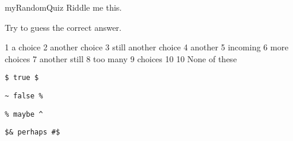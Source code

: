 \documentclass{article}
\begin{document}
\begin{quiz*}{myRandomQuiz}
    Riddle me this.
\begin{questions}
    \item Try to guess the correct answer.
    \begin{answers}{2}
    \bChoices[random]
         1 a choice\eAns
        \label{eq} 2 another choice\eAns
         3 still another choice\eAns
         4 another\eAns
         5 incoming\eAns
         6 more choices\eAns
         7 another still\eAns
         8 too many\eAns
         9 choices\eAns
         10 \eAns
    \eFreeze
         10 None of these\eAns
    \eChoices
    \end{answers}
\end{questions}
\end{quiz*}\quad\ScoreField\currQuiz\CorrButton\currQuiz


\newpage

\begin{rtVW}
\verb!$ true $!
\end{rtVW}
\begin{rtVW}
\verb!~ false %!
\end{rtVW}
\begin{rtVW}
\verb!% maybe ^!
\end{rtVW}
\begin{rtVW}
\verb!$& perhaps #$!
\end{rtVW}
\eRTVToks
\end{document}
